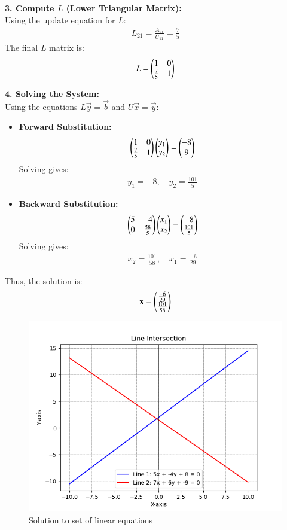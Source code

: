 \documentclass[journal]{IEEEtran}
\begin{document}
\textbf{3. Compute $L$ (Lower Triangular Matrix):}\\
Using the update equation for $L$:
\begin{align}
    L_{21} = \frac{A_{21}}{U_{11}} = \frac{7}{5}
\end{align}
The final $L$ matrix is:
\begin{align}
    L = \begin{pmatrix}1 & 0 \\ \frac{7}{5} & 1\end{pmatrix}
\end{align}

\textbf{4. Solving the System:}\\
Using the equations $L\vec{y} = \vec{b}$ and $U\vec{x} = \vec{y}$:
\begin{itemize}
    \item \textbf{Forward Substitution:}
    \begin{align}
        \begin{pmatrix}1 & 0 \\ \frac{7}{5} & 1\end{pmatrix}\begin{pmatrix}y_1 \\ y_2\end{pmatrix} = \begin{pmatrix}-8 \\ 9\end{pmatrix}
    \end{align}
    Solving gives:
    \begin{align}
        y_1 = -8, \quad y_2 = \frac{101}{5}
    \end{align}

    \item \textbf{Backward Substitution:}
    \begin{align}
        \begin{pmatrix}5 & -4 \\ 0 & \frac{58}{5}\end{pmatrix}\begin{pmatrix}x_1 \\ x_2\end{pmatrix} = \begin{pmatrix}-8 \\ \frac{101}{5}\end{pmatrix}
    \end{align}
    Solving gives:
    \begin{align}
        x_2 = \frac{101}{58}, \quad x_1 = \frac{-6}{29}
    \end{align}
\end{itemize}

Thus, the solution is:
\begin{align}
    \mathbf{x} = \begin{pmatrix}\frac{-6}{29} \\ \frac{101}{58}\end{pmatrix}
\end{align}

\begin{figure}[h!]
   \centering
   \includegraphics[width=0.7\columnwidth]{figs/fig.png}
    \caption{Solution to set of linear equations}
\end{figure}
\end{document}
